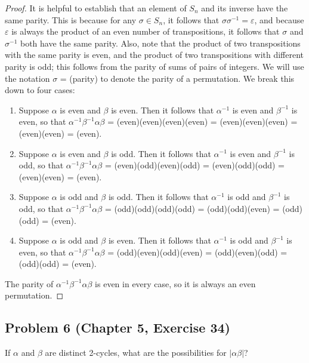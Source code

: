\documentclass{article}
\begin{document}
\begin{proof}
It is helpful to establish that an element of $S_n$ and its inverse have the same parity. This is because for any $\sigma \in S_n$, it follows that $\sigma\sigma^{-1} = \varepsilon$, and because $\varepsilon$ is always the product of an even number of transpositions, it follows that $\sigma$ and $\sigma^{-1}$ both have the same parity. Also, note that the product of two transpositions with the same parity is even, and the product of two transpositions with different parity is odd; this follows from the parity of sums of pairs of integers. We will use the notation $\sigma$ = (parity) to denote the parity of a permutation. We break this down to four cases:

\begin{enumerate}
    \item Suppose $\alpha$ is even and $\beta$ is even. Then it follows that $\alpha^{-1}$ is even and $\beta^{-1}$ is even, so that $\alpha^{-1}\beta^{-1}\alpha\beta$ = (even)(even)(even)(even) = (even)(even)(even) = (even)(even) = (even).
    \item Suppose $\alpha$ is even and $\beta$ is odd. Then it follows that $\alpha^{-1}$ is even and $\beta^{-1}$ is odd, so that $\alpha^{-1}\beta^{-1}\alpha\beta$ = (even)(odd)(even)(odd) = (even)(odd)(odd) = (even)(even) = (even).
    \item Suppose $\alpha$ is odd and $\beta$ is odd. Then it follows that $\alpha^{-1}$ is odd and $\beta^{-1}$ is odd, so that $\alpha^{-1}\beta^{-1}\alpha\beta$ = (odd)(odd)(odd)(odd) = (odd)(odd)(even) = (odd)(odd) = (even).
    \item Suppose $\alpha$ is odd and $\beta$ is even. Then it follows that $\alpha^{-1}$ is odd and $\beta^{-1}$ is even, so that $\alpha^{-1}\beta^{-1}\alpha\beta$ = (odd)(even)(odd)(even) = (odd)(even)(odd) = (odd)(odd) = (even).
\end{enumerate}
The parity of $\alpha^{-1}\beta^{-1}\alpha\beta$ is even in every case, so it is always an even permutation.

\end{proof}


\subsection*{Problem 6 (Chapter 5, Exercise 34)}
If $\alpha$ and $\beta$ are distinct 2-cycles, what are the possibilities for $|\alpha\beta|$?
\end{document}
